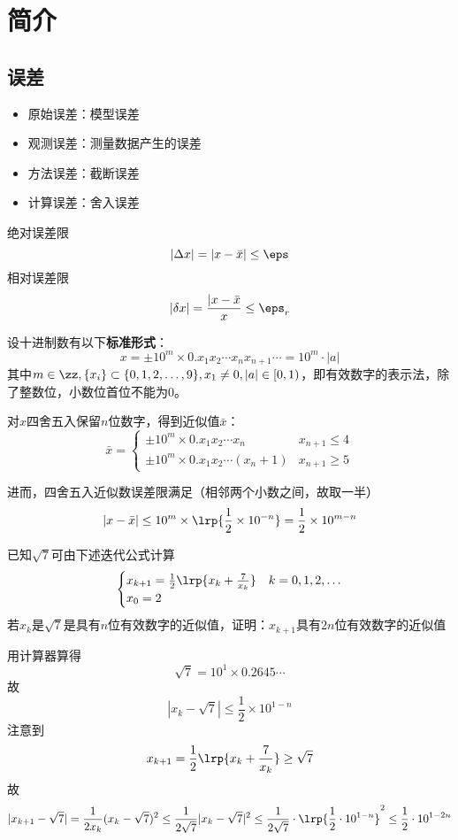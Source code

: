 
\section{简介}
\subsection{误差}
\begin{itemize}
	\item 原始误差：模型误差
	\item 观测误差：测量数据产生的误差
	\item 方法误差：截断误差
	\item 计算误差：舍入误差
\end{itemize}

\begin{definition}[误差限]
	绝对误差限
	\[|\Delta x|=|x-\bar{x}|\leq\eps\]
	相对误差限
	\[|\delta x|=\frac{|x-\bar{x}}{x}\leq \eps_r\]
\end{definition}

设十进制数有以下\textbf{标准形式}：
\[x=\pm 10^m\times 0.x_1 x_2\cdots x_n x_{n+1}\cdots=10^m\cdot|a|\]
其中$m\in\zz,\{x_i\}\subset\{0,1,2,\ldots,9\},x_1\ne 0,|a|\in[0,1)$，即有效数字的表示法，除了整数位，小数位首位不能为$0$。

对$x$四舍五入保留$n$位数字，得到近似值$\bar{x}$：
\[\bar{x}=\begin{cases}
	\pm 10^m\times 0.x_1 x_2\cdots x_n & x_{n+1}\leq 4\\
	\pm 10^m\times 0.x_1 x_2\cdots (x_n+1) & x_{n+1}\geq 5
\end{cases}\]

进而，四舍五入近似数误差限满足（相邻两个小数之间，故取一半）
\[|x-\bar{x}|\leq 10^m\times\lrp{\frac{1}{2}\times 10^{-n}}=\frac{1}{2}\times 10^{m-n}\]

\begin{example}
	已知$\sqrt{7}$可由下述迭代公式计算
	\[\begin{cases}
		x_{k+1}=\frac{1}{2}\lrp{x_k+\frac{7}{x_k}} & k=0,1,2,\ldots\\
		x_0=2
	\end{cases}\]
	若$x_k$是$\sqrt{7}$是具有$n$位有效数字的近似值，证明：$x_{k+1}$具有$2n$位有效数字的近似值
\end{example}
\begin{analysis}
	用计算器算得
	\[\sqrt{7}=10^1\times 0.2645\cdots\]
	故
	\[|x_k-\sqrt{7}|\leq\frac{1}{2}\times 10^{1-n}\]
	注意到
	\[x_{k+1}=\frac{1}{2}\lrp{x_k+\frac{7}{x_k}}\geq\sqrt{7}\]
	故
	\[|x_{k+1}-\sqrt{7}|=\frac{1}{2x_k}(x_k-\sqrt{7})^2\leq\frac{1}{2\sqrt{7}}|x_k-\sqrt{7}|^2\leq \frac{1}{2\sqrt{7}}\cdot\lrp{\frac{1}{2}\cdot 10^{1-n}}^2\leq\frac{1}{2}\cdot 10^{1-2n}\]
\end{analysis}

